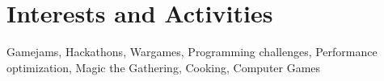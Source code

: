 \documentclass[a4paper,10pt]{article}
\begin{document}
\section{Interests and Activities}
Gamejams, Hackathons, Wargames, Programming challenges, Performance optimization, Magic the Gathering, Cooking, Computer Games


%
%
%
%


\end{document}
